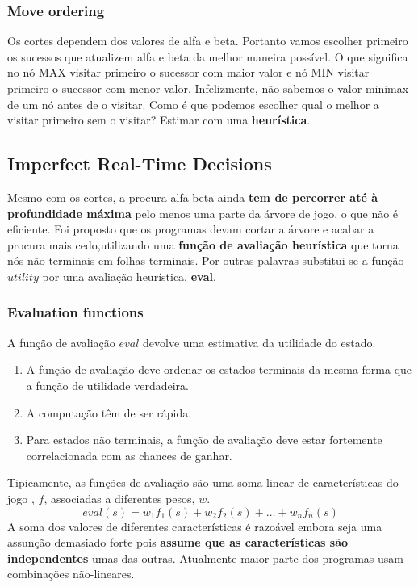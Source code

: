 \documentclass[11pt]{article}
\begin{document}
\subsubsection{Move ordering}

Os cortes dependem dos valores de alfa e beta. Portanto vamos escolher primeiro os
sucessos que atualizem alfa e beta da melhor maneira possível. O que significa no nó MAX visitar primeiro o sucessor com maior valor e nó MIN visitar primeiro o sucessor com menor valor.
Infelizmente, não sabemos o valor minimax de um nó antes de o visitar. Como é que podemos escolher qual o melhor a visitar primeiro sem o visitar? Estimar com uma \textbf{heurística}.

\subsection{Imperfect Real-Time Decisions}

Mesmo com os cortes, a procura alfa-beta ainda \textbf{tem de percorrer até à profundidade máxima} pelo menos uma parte da árvore de jogo, o que não é eficiente. Foi proposto que os programas devam cortar a árvore e acabar a procura mais cedo,utilizando uma \textbf{função de avaliação heurística} que torna nós não-terminais em folhas terminais. Por outras palavras substitui-se a função $utility$ por uma avaliação heurística, \textbf{eval}.

\subsubsection{Evaluation functions}

A função de avaliação $eval$ devolve uma estimativa da utilidade do estado.
\begin{enumerate}[topsep=4pt, itemsep=0pt]
    \item A função de avaliação deve ordenar os estados terminais da mesma forma que a função de utilidade verdadeira.
    \item A computação têm de ser rápida.
    \item Para estados não terminais, a função de avaliação deve estar fortemente correlacionada com as chances de ganhar.
\end{enumerate}
\vspace{4pt}

Tipicamente, as funções de avaliação são uma soma linear de características do jogo , $f$, associadas a diferentes pesos, $w$.
\begin{equation*}
    eval(s) = w_1f_1(s)+w_2f_2(s)+\ldots+w_nf_n(s)
\end{equation*}
A soma dos valores de diferentes características é razoável embora seja uma assunção demasiado forte pois \textbf{assume que as características são independentes} umas das outras. Atualmente maior parte dos programas usam combinações não-lineares.
\end{document}
